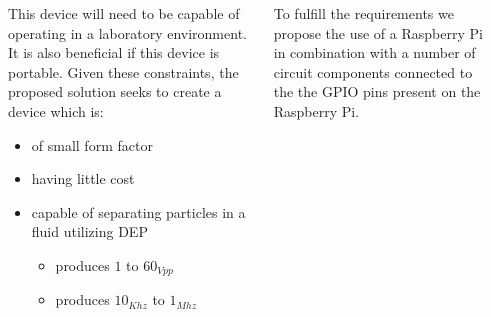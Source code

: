 \documentclass[25pt, a0paper, portrait, margin=0mm, innermargin=15mm, blockverticalspace=15mm, colspace=15mm, subcolspace=8mm]{tikzposter}
\begin{document}
\begin{columns}
{%
}


{
\begin{multicols}{2}

This device will need to be capable of operating in a laboratory environment.
It is also beneficial if this device is portable.
%
Given these constraints, the proposed solution seeks to create a device which is:
\begin{itemize}
\item of small form factor
\item having little cost
\item capable of separating particles in a fluid utilizing DEP
  \begin{itemize}
  \item produces $1$ to $60_{Vpp}$
  \item produces $10_{Khz}$ to $1_{Mhz}$
  \end{itemize}
\end{itemize}

\end{multicols}
}


{
\begin{multicols}{2}

To fulfill the requirements we propose the use of 
a Raspberry Pi in combination with 
a number of circuit components connected to the the GPIO pins
present on the Raspberry Pi.



\end{multicols}}
\end{columns}
\end{document}
